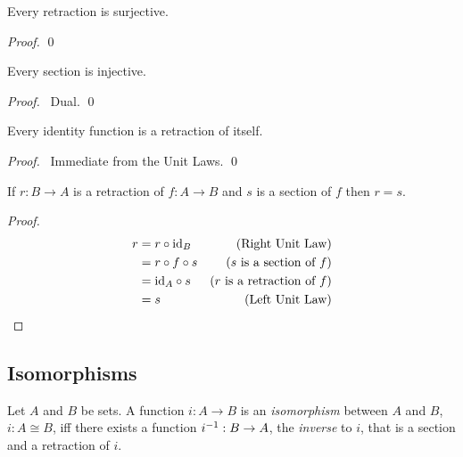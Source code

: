 \begin{prop}
\label{prop:sets:retraction:surjective}
Every retraction is surjective.
\end{prop}

\begin{proof}
\pf
{}
\qed
\end{proof}

\begin{prop}
\label{prop:sets:section:injective}
Every section is injective.
\end{prop}

\begin{proof}
\pf\ Dual. \qed
\end{proof}

\begin{prop}
\label{prop:sets:retraction:id}
Every identity function is a retraction of itself.
\end{prop}

\begin{proof}
\pf\ Immediate from the Unit Laws. \qed
\end{proof}

\begin{prop}
\label{prop:sets:retraction:ret_sect_unique}
If $r : B \rightarrow A$ is a retraction of $f : A \rightarrow B$ and $s$ is a section of $f$  then $ r = s$.
\end{prop}

\begin{proof}
\pf
\begin{align*}
r & = r \circ \mathrm{id}_{B} & (\text{Right Unit Law}) \\
& = r \circ f \circ s & (\text{$s$ is a section of $f$}) \\
& = \mathrm{id}_{A} \circ s & (\text{$r$ is a retraction of $f$}) \\
& = s & (\text{Left Unit Law})
\end{align*}
\end{proof}

\subsection{Isomorphisms}

\begin{df}[Isomorphism]
Let $A$ and $B$ be sets. A function $i : A \rightarrow B$  is an
\emph{isomorphism} between $A$ and $B$, $i : A \cong B$, iff there exists a
function ${i}^{-1} : B \rightarrow A$, the \emph{inverse} to $i$, that is a
section and a retraction of $i$.
\end{df}

